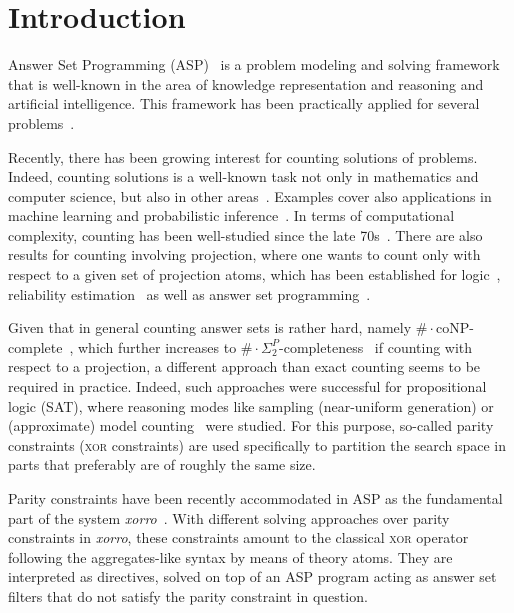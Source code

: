 \documentclass{article}
\newcommand{\XOR}{\textsc{xor}} %
\newcommand{\sysfont}{\textit}
\newcommand{\xorro}{\sysfont{xorro}}
\begin{document}
\section{Introduction} \label{sec:introduction}
%
Answer Set Programming (ASP)~\cite{Lifschitz99,BrewkaEiterTruszczynski11,GebserKaminskiKaufmannSchaub12} is a
problem modeling and solving framework that is well-known in the area
of knowledge representation and reasoning and artificial intelligence.
%
This framework has been practically applied for several
problems~\cite{BalducciniGelfondNogueira06a,NiemelaSimonsSoininen99,NogueiraBalducciniGelfond01a,GuziolowskiEtAl13a,SchaubWoltran18}.
%

Recently, there has been growing interest for counting solutions of problems.
%
Indeed, counting solutions is a well-known task not only in mathematics and computer
science, but also in other
areas~\cite{ChakrabortyMeelVardi16a,DomshlakHoffmann07a,GomesKautzSabharwalSelman08a,SangBeameKautz05a}.
%
%
%
Examples cover also applications in machine learning and probabilistic inference~\cite{ChaviraDarwiche08a}.
%
%
In terms of computational complexity, counting has been well-studied since the
late
70s~\cite{DurandHermannKolaitis05,HemaspaandraVollmer95a,Valiant79,Valiant79b}.
%
There are also results for counting involving projection, where one wants to
count only with respect to a given set of projection atoms,
which has been established for logic~\cite{AzizChuMuise15a,CapelliMengel19,FichteEtAl18,LagniezMarquis19a,GuptaSharmaRoy19a,SharmaRoySoos19a},
reliability estimation~\cite{MeelEtAl17a} as well as
answer set programming~\cite{GebserKaufmannSchaub09a,Aziz15a,FichteHecher19}.
%

Given that in general counting answer sets is rather hard, namely ${\#\cdot\text{coNP}}$-complete~\cite{FichteEtAl17,DurandHermannKolaitis05}, which further increases
to ${\#\cdot\Sigma_2^P}$-completeness~\cite{FichteHecher19} if counting with respect to a projection,
a different approach than exact counting seems to be required in practice.
%
Indeed, such approaches were successful for propositional logic (SAT), where reasoning modes like sampling (near-uniform generation)
or (approximate) model counting~\cite{gosase07a,gohosase07b,chmeva13a,chmeva13b,soomee19a}
were studied.
%
For this purpose, so-called parity constraints  (\XOR{} constraints) are used specifically to partition the search space in parts that preferably are of roughly the same size.

Parity constraints have been recently accommodated in ASP
as the fundamental part of the system \xorro{}~\cite{DBLP:conf/lpnmr/EverardoJKS19}.
%
With different solving approaches over parity constraints in \xorro{}, these constraints amount to the classical \XOR{} operator following the aggregates-like syntax by means of theory atoms.
They are interpreted as directives, solved on top of an ASP program acting as answer set filters that do not satisfy the parity constraint in question.
%
\end{document}
